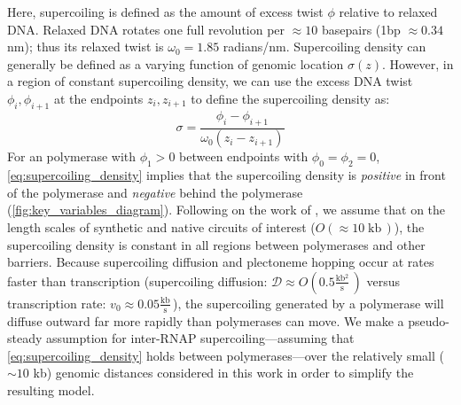 \documentclass[11pt]{article}
\newcommand{\units}[2]{\frac{\text{#1}}{\text{#2}}\,}
\newcommand{\unit}[1]{\; \text{#1}\,}
\begin{document}
Here, supercoiling is defined as the amount of excess twist \(\phi\) relative to relaxed DNA. Relaxed DNA rotates  one full revolution per \(\approx10\) basepairs (1bp \(\approx 0.34\) nm); thus its relaxed twist is \(\omega_0 = 1.85\) radians/nm. Supercoiling density can generally be defined as a varying function of genomic location \(\sigma(z)\). However, in a region of constant supercoiling density, we can use the excess DNA twist \(\phi_i, \phi_{i+1}\) at the endpoints \(z_i, z_{i+1}\) to define the supercoiling density as:
\begin{equation}
    \sigma = \frac{\phi_i - \phi_{i+1}}{\omega_0 (z_i - z_{i+1})}
\label{eq:supercoiling_density}
\end{equation}
For an polymerase with \(\phi_1 > 0\) between endpoints with \(\phi_0 = \phi_2 = 0\), \cref{eq:supercoiling_density} implies that the supercoiling density is \emph{positive} in front of the polymerase and \emph{negative} behind the polymerase (\cref{fig:key_variables_diagram}). Following on the work of \textcite{sevierPropertiesGeneExpression2018}, we assume that on the length scales of synthetic and native circuits of interest (\(O(\approx10 \unit{kb})\)), the supercoiling density is constant in all regions between polymerases and other barriers. Because supercoiling diffusion and plectoneme hopping \parencite{loenhoutDynamicsDNASupercoils2012} occur at rates faster than transcription (supercoiling diffusion: \(\mathcal{D} \approx O(0.5 \units{kb$^2$}{s})\) versus transcription rate: \(v_0 \approx 0.05 \units{kb}{s}\))\parencite{munizRNAPolymeraseII2021}, the supercoiling generated by a polymerase will diffuse outward far more rapidly than polymerases can move. We make a pseudo-steady assumption for inter-RNAP supercoiling---assuming that \cref{eq:supercoiling_density} holds between polymerases---over the relatively small (\(\sim 10\) kb) genomic distances considered in this work in order to simplify the resulting model.
\end{document}
